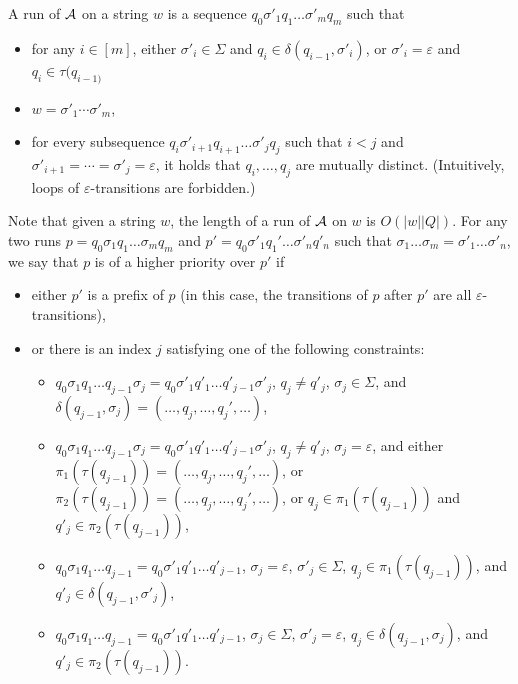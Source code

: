 A  run of $\mathcal{A}$ on a string $w$ is a sequence $q_0 \sigma'_1 q_1 \ldots \sigma'_m q_m$ such that 
\begin{itemize}
\item for any $i \in [m]$, either $\sigma'_i \in \Sigma$ and $q_i \in \delta (q_{i - 1}, \sigma'_i)$, or $\sigma'_i = \varepsilon$ and $q_i \in \tau(q_{i-1)}$ %
\item $w = \sigma'_1 \cdots \sigma'_m$,
%
\item for every subsequence $q_i \sigma'_{i+1} q_{i+1} \ldots \sigma'_{j} q_j$ such that  $i < j$ and $\sigma'_{i+1} = \cdots = \sigma'_j = \varepsilon$, it holds that $q_i, \ldots, q_j$ are mutually distinct. (Intuitively, loops of $\varepsilon$-transitions are forbidden.) 
\end{itemize}
Note that given a string $w$, the length of a run of $\mathcal{A}$ on $w$ is $O(|w||Q|)$.
For any two runs $p = q_0 \sigma_1 q_1 \ldots \sigma_m q_m$ and $p' =  q_0 \sigma'_1 q_1' \ldots \sigma'_n q'_n$ such that $\sigma_1 \ldots \sigma_m = \sigma'_1 \ldots \sigma'_n$, we say that $p$ is of a higher priority over $p'$ if 
\begin{itemize}
\item either $p'$ is a prefix of $p$ (in this case, the transitions of $p$ after $p'$ are all $\varepsilon$-transitions), 
%
\item or there is an index $j$ satisfying one of the following constraints:
\begin{itemize}
\item $q_0 \sigma_1 q_1 \ldots q_{j-1} \sigma_j = q_0 \sigma'_1 q'_1 \ldots q'_{j-1} \sigma'_j$, $q_j \neq q'_j$, $\sigma_j \in \Sigma$, and $\delta (q_{j - 1}, \sigma_j) =(\ldots, q_j, \ldots, q_j', \ldots)$,
%
\item $q_0 \sigma_1 q_1 \ldots q_{j-1} \sigma_j = q_0 \sigma'_1 q'_1 \ldots q'_{j-1} \sigma'_j$, $q_j \neq q'_j$, $\sigma_j  = \varepsilon$,  and  either $\pi_1(\tau(q_{j - 1})) = (\ldots, q_j, \ldots, q_j', \ldots)$, or $\pi_2(\tau(q_{j - 1})) = (\ldots, q_j, \ldots, q_j', \ldots)$, or $q_j \in \pi_1(\tau(q_{j - 1}))$ and $q'_j \in \pi_2(\tau(q_{j-1}))$, 
%
\item $q_0 \sigma_1 q_1 \ldots q_{j-1}  = q_0 \sigma'_1 q'_1 \ldots q'_{j-1} $, $\sigma_j  = \varepsilon$, $\sigma'_j  \in \Sigma$, $q_j \in \pi_1(\tau(q_{j - 1}))$, and $q'_j \in \delta(q_{j-1}, \sigma'_j)$, 
%
\item $q_0 \sigma_1 q_1 \ldots q_{j-1}  = q_0 \sigma'_1 q'_1 \ldots q'_{j-1} $, $\sigma_j  \in \Sigma$, $\sigma'_j  = \varepsilon$, $q_j \in \delta(q_{j - 1}, \sigma_j)$, and $q'_j \in \pi_2(\tau(q_{j-1}))$.
\end{itemize}
\end{itemize}


